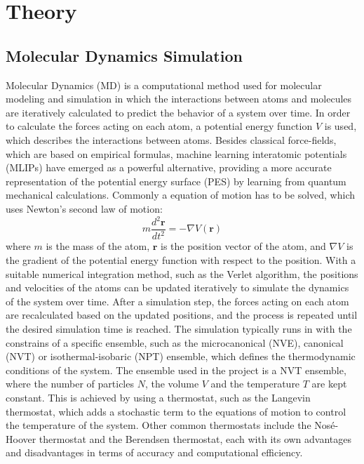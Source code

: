 \section{Theory}

\subsection{Molecular Dynamics Simulation}

Molecular Dynamics (MD) is a computational method used for molecular modeling and simulation in which the interactions between atoms and molecules are iteratively calculated to predict the behavior of a system over time. In order to calculate the forces acting on each atom, a potential energy function \(V\) is used, which describes the interactions between atoms. Besides classical force-fields, which are based on empirical formulas, machine learning interatomic potentials (MLIPs) have emerged as a powerful alternative, providing a more accurate representation of the potential energy surface (PES) by learning from quantum mechanical calculations.
Commonly a equation of motion has to be solved, which uses Newton's second law of motion:
\begin{equation}
    m \frac{d^2 \textbf{r}}{dt^2} = -\nabla V(\textbf{r})
\end{equation}
where \(m\) is the mass of the atom, \(\textbf{r}\) is the position vector of the atom, and \(\nabla V\) is the gradient of the potential energy function with respect to the position. With a suitable numerical integration method, such as the Verlet algorithm, the positions and velocities of the atoms can be updated iteratively to simulate the dynamics of the system over time.
After a simulation step, the forces acting on each atom are recalculated based on the updated positions, and the process is repeated until the desired simulation time is reached.
The simulation typically runs in with the constrains of a specific ensemble, such as the microcanonical (NVE), canonical (NVT) or isothermal-isobaric (NPT) ensemble, which defines the thermodynamic conditions of the system.
The ensemble used in the project is a NVT ensemble, where the number of particles \(N\), the volume \(V\) and the temperature \(T\) are kept constant. This is achieved by using a thermostat, such as the Langevin thermostat, which adds a stochastic term to the equations of motion to control the temperature of the system. Other common thermostats include the Nosé-Hoover thermostat and the Berendsen thermostat, each with its own advantages and disadvantages in terms of accuracy and computational efficiency.
